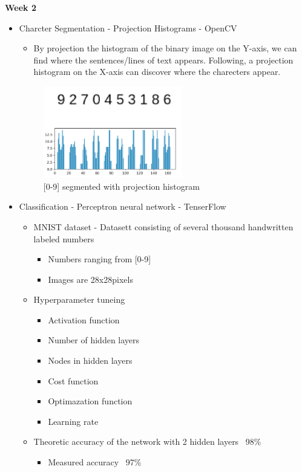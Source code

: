 \documentclass[11pt,a4paper,english]{article}
\newenvironment{loggentry}[2]%
{\noindent\textbf{#2}\marginnote{#1}\\}{\vspace{0.5cm}}
\begin{document}
\newpage
\begin{loggentry}{26.04.18}{Week 2}
\begin{itemize}
  \item{Charcter Segmentation - Projection Histograms - OpenCV}
  \begin{itemize}
    \item{By projection the histogram of the binary image on the Y-axis,
    we can find where the sentences/lines of text appears. Following, a
    projection histogram on the X-axis can discover where the charecters
    appear.}
  \end{itemize}

  \begin{figure}[H]
    \centering
    \includegraphics[height=4cm]{res/0-9_segmented_out.png}
    \caption{[0-9] segmented with projection histogram}
    \label{fig:0-9_segmented_out}
  \end{figure}

  \item{Classification - Perceptron neural network - TenserFlow}
    \begin{itemize}
      \item{MNIST dataset - Datasett consisting of several thousand handwritten
      labeled numbers}
      \begin{itemize}
        \item{Numbers ranging from [0-9]}
        \item{Images are 28x28pixels}
      \end{itemize}
      \item{Hyperparameter tuneing}
      \begin{itemize}
        \item{Activation function}
        \item{Number of hidden layers}
        \item{Nodes in hidden layers}
        \item{Cost function}
        \item{Optimazation function}
        \item{Learning rate}
      \end{itemize}
      \item{Theoretic accuracy of the network with 2 hidden layers ~98\%}
      \begin{itemize}
        \item{Measured accuracy ~97\%}


\end{itemize}
\end{itemize}
\end{itemize}
\end{loggentry}
\end{document}
